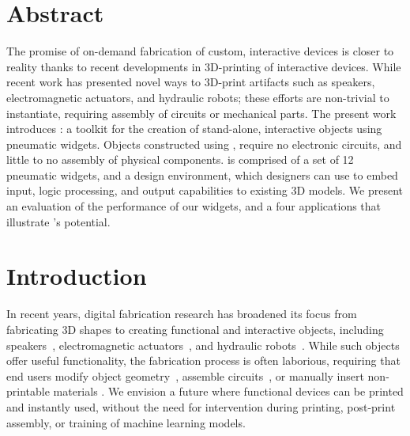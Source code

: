   \bigskip
  \vfill

  \newpage

  \section{Abstract}
    The promise of on-demand fabrication of custom, interactive devices is
    closer to reality thanks to recent developments in 3D-printing of
    interactive devices. While recent work has presented novel ways to
    3D-print artifacts such as speakers, electromagnetic actuators, and
    hydraulic robots; these efforts are non-trivial to instantiate,
    requiring assembly of circuits or mechanical parts. The present work
    introduces \al: a toolkit for the creation of stand-alone, interactive
    objects using pneumatic widgets. Objects constructed using \al, require
    no electronic circuits, and little to no assembly of physical
    components. \al is comprised of a set of 12 pneumatic widgets, and a
    design environment, which designers can use to embed input, logic
    processing, and output capabilities to existing 3D models. We present
    an evaluation of the performance of our widgets, and a four
    applications that illustrate \al's potential.

  \section{Introduction}
    In recent years, digital fabrication research has broadened its
    focus from fabricating 3D shapes to creating
    functional and interactive objects, including
    speakers~\cite{Ishiguro:2014}, 
    electromagnetic actuators~\cite{Peng:2016}, and hydraulic
    robots~\cite{MacCurdy:2016}. While such objects offer useful
    functionality, the fabrication process is often laborious,
    requiring that end users modify object
    geometry~\cite{Ledo:2017}, assemble
    circuits~\cite{Murray-Smith:2008}, or 
    manually insert non-printable materials \cite{He:2017}. We
    envision a future where functional devices can be printed and
    instantly used, without the need for intervention during
    printing, post-print assembly, or training of machine learning
    models.


